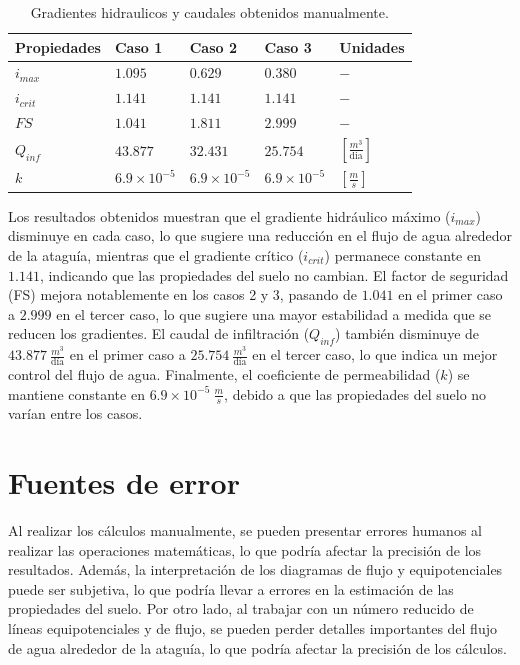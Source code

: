 \begin{table}[H]
    \begin{center}
        \caption{Gradientes hidraulicos y caudales obtenidos manualmente.}
        \begin{tabularx}{0.75\textwidth}{>{\centering\arraybackslash}X >{\centering\arraybackslash}X >{\centering\arraybackslash}X >{\centering\arraybackslash}X >{\centering\arraybackslash}X}
        \hline
        \textbf{Propiedades} & \textbf{Caso 1} & \textbf{Caso 2} & \textbf{Caso 3} & \textbf{Unidades} \\
        \hline
        $i_{max}$ & $1.095$ & $0.629$ & $0.380$ & $-$ \\
        $i_{crit}$ & $1.141$ & $1.141$ & $1.141$ & $-$ \\
        $FS$ & $1.041$ & $1.811$ & $2.999$ & $-$\\
        $Q_{inf}$ & $43.877$ & $32.431$ & $25.754$ & $[\frac{m^3}{\text{dia}}]$\\
        $k$ & $6.9 \times 10^{-5}$ & $6.9 \times 10^{-5}$ & $6.9 \times 10^{-5}$ & $[\frac{m}{s}]$\\
        \hline
        \end{tabularx}
        \label{tab:Manuales1}
    \end{center}
\end{table}

Los resultados obtenidos muestran que el gradiente hidráulico máximo ($i_{max}$) disminuye en cada caso, lo que sugiere una reducción en el flujo de agua alrededor de la ataguía, mientras que el gradiente crítico ($i_{crit}$) permanece constante en $1.141$, indicando que las propiedades del suelo no cambian. El factor de seguridad (FS) mejora notablemente en los casos 2 y 3, pasando de $1.041$ en el primer caso a $2.999$ en el tercer caso, lo que sugiere una mayor estabilidad a medida que se reducen los gradientes. El caudal de infiltración ($Q_{inf}$) también disminuye de $43.877 \ \frac{m^3}{\text{día}}$ en el primer caso a $25.754 \ \frac{m^3}{\text{día}}$ en el tercer caso, lo que indica un mejor control del flujo de agua. Finalmente, el coeficiente de permeabilidad ($k$) se mantiene constante en $6.9 \times 10^{-5} \ \frac{m}{s}$, debido a que las propiedades del suelo no varían entre los casos.

\section{Fuentes de error}

Al realizar los cálculos manualmente, se pueden presentar errores humanos al realizar las operaciones matemáticas, lo que podría afectar la precisión de los resultados. Además, la interpretación de los diagramas de flujo y equipotenciales puede ser subjetiva, lo que podría llevar a errores en la estimación de las propiedades del suelo. Por otro lado, al trabajar con un número reducido de líneas equipotenciales y de flujo, se pueden perder detalles importantes del flujo de agua alrededor de la ataguía, lo que podría afectar la precisión de los cálculos. 

